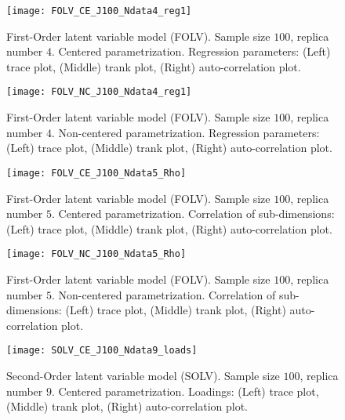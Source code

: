 %
\begin{figure}[H]
	\centering
	\texttt{[image: FOLV\_CE\_J100\_Ndata4\_reg1]}
	\caption[First-Order latent variable model (FOLV). Sample size $100$, replica number $4$. Centered parametrization. Regression parameters. Trace, trank and auto-correlation plots.]%
	{First-Order latent variable model (FOLV). Sample size $100$, replica number $4$. Centered parametrization. Regression parameters: (Left) trace plot, (Middle) trank plot, (Right) auto-correlation plot.}
	\label{fig:FOLV_CE_chains7}
\end{figure}
%
\begin{figure}[H]
	\centering
	\texttt{[image: FOLV\_NC\_J100\_Ndata4\_reg1]}
	\caption[First-Order latent variable model (FOLV). Sample size $100$, replica number $4$. Non-centered parametrization. Regression parameters. Trace, trank and auto-correlation plots.]%
	{First-Order latent variable model (FOLV). Sample size $100$, replica number $4$. Non-centered parametrization. Regression parameters: (Left) trace plot, (Middle) trank plot, (Right) auto-correlation plot.}
	\label{fig:FOLV_NC_chains7}
\end{figure}
%
\begin{figure}[H]
	\centering
	\texttt{[image: FOLV\_CE\_J100\_Ndata5\_Rho]}
	\caption[First-Order latent variable model (FOLV). Sample size $100$, replica number $5$. Centered parametrization. Correlation of sub-dimensions. Trace, trank and auto-correlation plots.]%
	{First-Order latent variable model (FOLV). Sample size $100$, replica number $5$. Centered parametrization. Correlation of sub-dimensions: (Left) trace plot, (Middle) trank plot, (Right) auto-correlation plot.}
	\label{fig:FOLV_CE_chains8}
\end{figure}
%
\begin{figure}[H]
	\centering
	\texttt{[image: FOLV\_NC\_J100\_Ndata5\_Rho]}
	\caption[First-Order latent variable model (FOLV). Sample size $100$, replica number $5$. Non-centered parametrization. Correlation of sub-dimensions. Trace, trank and auto-correlation plots.]%
	{First-Order latent variable model (FOLV). Sample size $100$, replica number $5$. Non-centered parametrization. Correlation of sub-dimensions: (Left) trace plot, (Middle) trank plot, (Right) auto-correlation plot.}
	\label{fig:FOLV_NC_chains8}
\end{figure}
%
\begin{figure}[H]
	\centering
	\texttt{[image: SOLV\_CE\_J100\_Ndata9\_loads]}
	\caption[Second-Order latent variable model (SOLV). Sample size $100$, replica number $9$. Centered parametrization. Loadings. Trace, trank and auto-correlation plots.]%
	{Second-Order latent variable model (SOLV). Sample size $100$, replica number $9$. Centered parametrization. Loadings: (Left) trace plot, (Middle) trank plot, (Right) auto-correlation plot.}
	\label{fig:SOLV_CE_chains1}
\end{figure}
